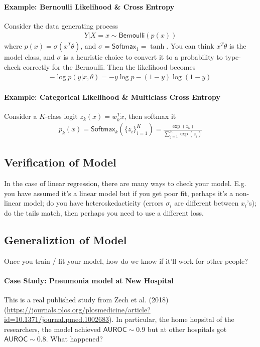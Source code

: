 \paragraph{Example: Bernoulli Likelihood \& Cross Entropy}
Consider the data generating process
\begin{align}
	Y | X=x \sim \textsf{Bernoulli}(p(x)) 
\end{align}
where $p(x) = \sigma(x^T \theta)$, and $\sigma = \textsf{Softmax}_1 = \tanh$. You can think $x^T \theta$ is the model class, and $\sigma$ is a heuristic choice to convert it to a probability to type-check correctly for the \textsf{Bernoulli}. Then the likelihood becomes
\begin{align}
	- \log p(y | x, \theta) = - y \log p - (1-y) \log (1-y)
\end{align}

\paragraph{Example: Categorical Likelihood \& Multiclass Cross Entropy}
Consider a $K$-class logit $z_k(x) = w_k^T x$, then softmax it
\begin{align}
	p_k(x) = \textsf{Softmax}_k(\{z_i\}_{i=1}^K) = \frac{\exp(z_k) }{\sum_{j=1}^K \exp(z_j)}
\end{align}

\subsection{Verification of Model}
In the case of linear regression, there are many ways to check your model. E.g. you have assumed it's a linear model but if you get poor fit, perhaps it's a non-linear model; do you have heteroskedacticity (errors $\sigma_i$ are different between $x_i$'s); do the tails match, then perhaps you need to use a different loss.

\subsection{Generaliztion of Model}
Once you train / fit your model, how do we know if it'll work for other people?

\paragraph{Case Study: Pneumonia model at New Hospital}
This is a real published study from Zech et al. (2018) (\url{https://journals.plos.org/plosmedicine/article?id=10.1371/journal.pmed.1002683}). In particular, the home hopsital of the researchers, the model achieved $\textsf{AUROC} \sim 0.9$ but at other hospitals got $\textsf{AUROC} \sim 0.8$. What happened?

